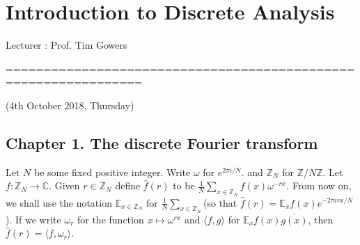 \documentclass[10pt,a4paper]{report}
\DeclarePairedDelimiter\bignorm{\lVert}{\rVert}
\renewcommand{\hat}{\widehat}
\begin{document}
\newcommand{\thm}{\textbf{Theorem) }}
\newcommand{\thmnum}[1]{\textbf{Theorem #1) }}
\newcommand{\defi}{\textbf{Definition) }}
\newcommand{\lem}{\textbf{Lemma) }}
\newcommand{\lemnum}[1]{\textbf{Lemma #1) }}
\newcommand{\prop}{\textbf{Proposition) }}
\newcommand{\propnum}[1]{\textbf{Proposition #1) }}
\newcommand{\cor}{\textbf{Corollary) }}
\newcommand{\cornum}[1]{\textbf{Corollary #1) }}


\newcommand{\pf}{\textbf{proof) }}
\newcommand{\eop}{\hfill  \textsl{(End of proof)} $\square$} %


\newcommand{\lap}{\triangle} %
\newcommand{\s}{\vspace{10pt}}
\newcommand{\bull}{$\bullet$}
\newcommand{\sta}{$\star$}
\newcommand{\reals}{\mathbb{R}}

\newcommand{\intN}{\mathbb{Z}_N}
\newcommand{\norms}[2]{\bignorm[\big]{#1}_{#2}}
\newcommand{\avg}{\mathbb{E}}
\newcommand{\prob}{\mathbb{P}}
\newcommand{\osc}{\text{\osc}}

\newcommand{\boxnorm}[1]{\norms{#1}{\tiny{\square}}}

\newcommand{\boxinn}[4]{\begin{array}{|cc|} 
\cline{1-2}
#1 & #2 \\
#3 & #4 \\
\cline{1-2}
\end{array}}

\newcommand{\newday}{================================================================}
\newcommand{\digression}{**********************************************************************************************}

\renewcommand{\bar}{\overline}

\setlength\parindent{0pt}

\chapter*{Introduction to Discrete Analysis}
\s

Lecturer : Prof. Tim Gowers
\s

\newday

(4th October 2018, Thursday)
\s

\section*{Chapter 1. The discrete Fourier transform}
\s

Let $N$ be some fixed positive integer. Write $\omega$ for $e^{2\pi i /N}$. and $\mathbb{Z}_N$ for $\mathbb{Z}/N\mathbb{Z}$. Let $f: \mathbb{Z}_N \rightarrow \mathbb{C}$. Given $r \in \mathbb{Z}_N$ define $\hat{f}(r)$ to be $\frac{1}{N} \sum_{x \in \mathbb{Z}_N} f(x) \omega^{-rx}$. From now on, we shall use the notation $\mathbb{E}_{x\in \mathbb{Z}_N}$ for $\frac{1}{N} \sum_{x \in \mathbb{Z}_N}$(so that $\hat{f}(r)  = \mathbb{E}_x f(x)e^{-2\pi i rx/N}$). If we write $\omega_r$ for the function $x\mapsto \omega^{rx}$ and $\langle f,g \rangle$ for $\mathbb{E}_x f(x)\bar{g(x)}$, then $\hat{f}(r) = \langle f,\omega_r \rangle$.
\s
\end{document}
